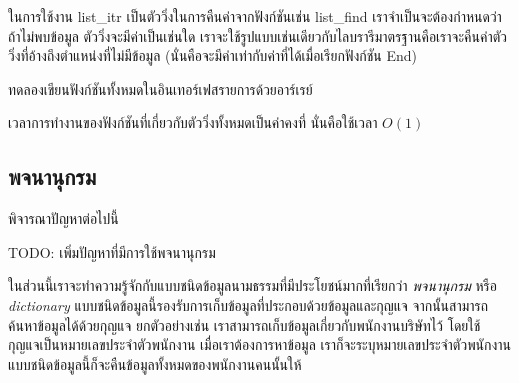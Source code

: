 ใน{\wbr}การ{\wbr}ใช้{\wbr}งาน {\ct list\_itr} เป็น{\wbr}ตัว{\wbr}วิ่ง{\wbr}ใน{\wbr}การ{\wbr}คืน{\wbr}ค่า{\wbr}จาก{\wbr}ฟังก์ชัน{\wbr}เช่น {\ct list\_find}
เรา{\wbr}จำเป็น{\wbr}จะ{\wbr}ต้อง{\wbr}กำหนด{\wbr}ว่า{\wbr}ถ้า{\wbr}ไม่{\wbr}พบ{\wbr}ข้อมูล ตัว{\wbr}วิ่ง{\wbr}จะ{\wbr}มี{\wbr}ค่า{\wbr}เป็น{\wbr}เช่น{\wbr}ใด{\wbr}
เรา{\wbr}จะ{\wbr}ใช้{\wbr}รูปแบบ{\wbr}เช่นเดียวกับ{\wbr}ไลบ{\wbr}รา{\wbr}รี{\wbr}มาตรฐาน{\wbr}คือ{\wbr}เรา{\wbr}จะ{\wbr}คืน{\wbr}ค่าตัว{\wbr}วิ่ง{\wbr}ที่{\wbr}อ้าง{\wbr}ถึง{\wbr}ตำแหน่ง{\wbr}ที่{\wbr}ไม่{\wbr}มี{\wbr}ข้อมูล{\wbr}
(นั่น{\wbr}คือ{\wbr}จะ{\wbr}มี{\wbr}ค่า{\wbr}เท่า{\wbr}กับ{\wbr}ค่า{\wbr}ที่{\wbr}ได้{\wbr}เมื่อ{\wbr}เรียก{\wbr}ฟังก์ชัน End)

\begin{quiz}{}
ทดลอง{\wbr}เขียน{\wbr}ฟังก์ชัน{\wbr}ทั้งหมด{\wbr}ใน{\wbr}อิน{\wbr}เทอร์เฟส{\wbr}รายการ{\wbr}ด้วย{\wbr}อาร์เรย์
\end{quiz}

เวลา{\wbr}การ{\wbr}ทำงาน{\wbr}ของ{\wbr}ฟังก์ชัน{\wbr}ที่{\wbr}เกี่ยวกับ{\wbr}ตัว{\wbr}วิ่ง{\wbr}ทั้งหมด{\wbr}เป็น{\wbr}ค่าคงที่ นั่น{\wbr}คือ{\wbr}ใช้เวลา $O(1)$ 

\subsection{พจนานุกรม}
พิจารณา{\wbr}ปัญหา{\wbr}ต่อไปนี้{\wbr}

\begin{prob}{}
TODO: เพิ่ม{\wbr}ปัญหา{\wbr}ที่{\wbr}มี{\wbr}การ{\wbr}ใช้{\wbr}พจนานุกรม{\wbr}
\end{prob}

ใน{\wbr}ส่วน{\wbr}นี้{\wbr}เรา{\wbr}จะ{\wbr}ทำ{\wbr}ความ{\wbr}รู้จัก{\wbr}กับ{\wbr}แบบ{\wbr}ชนิด{\wbr}ข้อมูล{\wbr}นามธรรม{\wbr}ที่{\wbr}มี{\wbr}ประโยชน์{\wbr}มาก{\wbr}ที่{\wbr}เรียก{\wbr}ว่า {\em
  พจนานุกรม} หรือ {\em dictionary}
แบบ{\wbr}ชนิด{\wbr}ข้อมูล{\wbr}นี้{\wbr}รองรับ{\wbr}การ{\wbr}เก็บ{\wbr}ข้อมูล{\wbr}ที่{\wbr}ประกอบ{\wbr}ด้วย{\wbr}ข้อมูล{\wbr}และ{\wbr}กุญแจ{\wbr}
จากนั้น{\wbr}สามารถ{\wbr}ค้นหา{\wbr}ข้อมูล{\wbr}ได้{\wbr}ด้วย{\wbr}กุญแจ ยก{\wbr}ตัวอย่าง{\wbr}เช่น{\wbr}
เรา{\wbr}สามารถ{\wbr}เก็บ{\wbr}ข้อมูล{\wbr}เกี่ยวกับ{\wbr}พนักงาน{\wbr}บริษัท{\wbr}ไว้ โดย{\wbr}ใช้{\wbr}กุญแจ{\wbr}เป็น{\wbr}หมายเลข{\wbr}ประจำตัว{\wbr}พนักงาน{\wbr}
เมื่อ{\wbr}เรา{\wbr}ต้องการ{\wbr}หา{\wbr}ข้อมูล เรา{\wbr}ก็{\wbr}จะ{\wbr}ระบุ{\wbr}หมายเลข{\wbr}ประจำตัว{\wbr}พนักงาน{\wbr}
แบบ{\wbr}ชนิด{\wbr}ข้อมูล{\wbr}นี้{\wbr}ก็{\wbr}จะ{\wbr}คืน{\wbr}ข้อมูล{\wbr}ทั้งหมด{\wbr}ของ{\wbr}พนักงาน{\wbr}คน{\wbr}นั้น{\wbr}ให้{\wbr}

